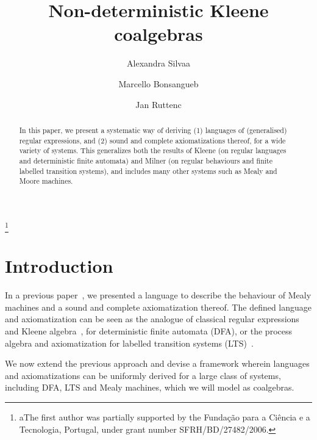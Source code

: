 \documentclass{LMCS}
\theoremstyle{definition}
\theoremstyle{plain}
\theoremstyle{plain}
\theoremstyle{plain}
\theoremstyle{plain}
\theoremstyle{definition}
\theoremstyle{definition}
\begin{document}
\title{Non-deterministic Kleene coalgebras}
\author[A.~Silva]{Alexandra Silva\rsuper a}  
\address{{\lsuper a}CWI, Amsterdam, The Netherlands}  
\thanks{{\lsuper a}The first author was partially supported by the
Funda\c{c}\~ao para a Ci\^encia e a Tecnologia, Portugal, under grant
number SFRH/BD/27482/2006.} 

\author[M.~Bonsangue]{Marcello Bonsangue\rsuper b}
\address{{\lsuper b}LIACS, University of Leiden,The Netherlands}

\author[J.~Rutten]{Jan Rutten\rsuper c}	
\address{{\lsuper c}CWI (Amsterdam), VUA (Amsterdam) and RUN (Nijmegen) , The Netherlands}	


\begin{abstract}
In this paper, we present a systematic way of deriving (1) languages of (generalised) regular expressions, and
(2) sound and complete axiomatizations thereof,
for a wide variety of systems. 
This generalizes both the
results of Kleene (on regular languages and deterministic finite
automata)
and Milner (on regular behaviours and finite labelled transition
systems),
and includes many other systems such as Mealy and Moore machines.
\end{abstract}

\maketitle

\section{Introduction}
In a previous paper~\cite{BRS08}, we presented a language to describe the 
behaviour of Mealy machines and a sound and complete axiomatization
thereof. The defined language and axiomatization can be seen as the analogue of classical regular
expressions~\cite{kleene} and Kleene algebra~\cite{kozen}, for
deterministic finite automata (DFA), or the
process algebra and axiomatization for labelled transition
systems (LTS)~\cite{milner}.

We now extend the previous approach and devise a framework wherein
languages and axiomatizations can be uniformly derived for a large
class of systems, including DFA, LTS and Mealy machines, which we
will model as coalgebras.
 
\end{document}
